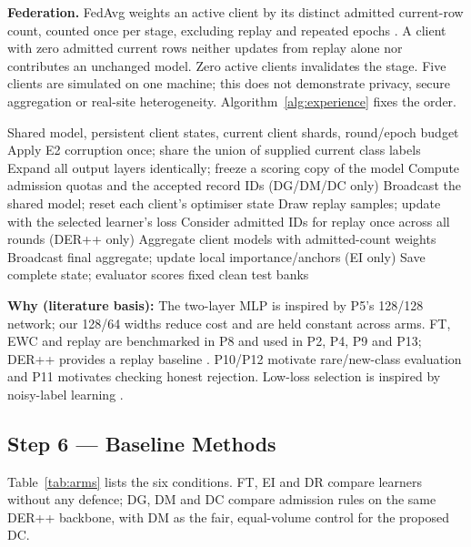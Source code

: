 \documentclass[10pt,a4paper]{article}
\newcommand{\why}[1]{\par\nopagebreak[4]\noindent\colorbox{black!5}{\parbox{\dimexpr\linewidth-2\fboxsep}{\small\textbf{Why (literature basis):} #1}}\par}
\begin{document}
\textbf{Federation.} FedAvg weights an active client by its distinct admitted current-row count, counted once per stage, excluding replay and repeated epochs \cite{fedavg}. A client with zero admitted current rows neither updates from replay alone nor contributes an unchanged model. Zero active clients invalidates the stage. Five clients are simulated on one machine; this does not demonstrate privacy, secure aggregation or real-site heterogeneity. Algorithm~\ref{alg:experience} fixes the order.

\begin{algorithm}[H]
\caption{One supervised stage (experience)}
\label{alg:experience}
\begin{algorithmic}[1]
\Require Shared model, persistent client states, current client shards, round/epoch budget
\State Apply E2 corruption once; share the union of supplied current class labels
\State Expand all output layers identically; freeze a scoring copy of the model
\State Compute admission quotas and the accepted record IDs (DG/DM/DC only)
\State Broadcast the shared model; reset each client's optimiser state
\State Draw replay samples; update with the selected learner's loss
\State Consider admitted IDs for replay once across all rounds (DER++ only)
\EndFor
\State Aggregate client models with admitted-count weights
\EndFor
\State Broadcast final aggregate; update local importance/anchors (EI only)
\State Save complete state; evaluator scores fixed clean test banks
\end{algorithmic}
\end{algorithm}

\why{The two-layer MLP is inspired by P5's 128/128 network; our 128/64 widths reduce cost and are held constant across arms. FT, EWC and replay are benchmarked in P8 and used in P2, P4, P9 and P13; DER++ provides a replay baseline \cite{der}. P10/P12 motivate rare/new-class evaluation and P11 motivates checking honest rejection. Low-loss selection is inspired by noisy-label learning \cite{coteach,mentornet}.}

\subsection{Step 6 --- Baseline Methods}
Table~\ref{tab:arms} lists the six conditions. FT, EI and DR compare learners without any defence; DG, DM and DC compare admission rules on the same DER++ backbone, with DM as the fair, equal-volume control for the proposed DC.
\end{document}
